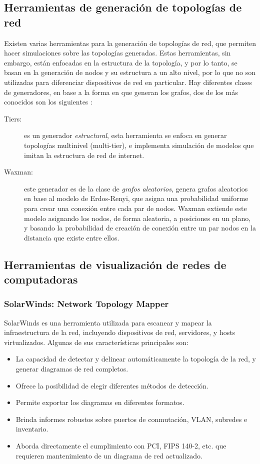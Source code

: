\subsection{Herramientas de generación de topologías de red}
Existen varias herramientas para la generación de topologías de red, que permiten hacer simulaciones sobre las topologías generadas. Estas herramientas, sin embargo, están enfocadas en la estructura de la topología, y por lo tanto, se basan en la generación de nodos y su estructura a un alto nivel, por lo que no son utilizadas para diferenciar dispositivos de red en particular.
Hay diferentes clases de generadores, en base a la forma en que generan los grafos, dos de los más conocidos son los siguientes \cite{tangmunarunkit2002network}:
\begin{description}
\item[Tiers:] es un generador \textit{estructural}, esta herramienta se enfoca en generar topologías multinivel (multi-tier), e implementa simulación de modelos que imitan la estructura de red de internet.

\item[Waxman:] este generador es de la clase de \textit{grafos aleatorios}, genera grafos aleatorios en base al modelo de Erdos-Renyi, que asigna una probabilidad uniforme para crear una conexión entre cada par de nodos. Waxman extiende este modelo asignando los nodos, de forma aleatoria, a posiciones en un plano, y basando la probabilidad de creación de conexión entre un par nodos en la distancia que existe entre ellos. 
\end{description}

\subsection{Herramientas de visualización de redes de computadoras} \label{Herramientas de visualización}
\subsubsection{SolarWinds: Network Topology Mapper \cite{solarwinds}} \label{SolarWinds Topology Mapper}
SolarWinds es una herramienta utilizada para escanear y mapear la infraestructura de la red, incluyendo dispositivos de red, servidores, y hosts virtualizados.
Algunas de sus características principales son:
\begin{itemize}
\item La capacidad de detectar y delinear automáticamente la topología de la red, y generar diagramas de red completos. 
\item Ofrece la posibilidad de elegir diferentes métodos de detección. \item Permite exportar los diagramas en diferentes formatos.
\item Brinda informes robustos sobre puertos de conmutación, VLAN, subredes e inventario.
\item Aborda directamente el cumplimiento con PCI, FIPS 140-2, etc. que requieren mantenimiento de un diagrama de red actualizado.
\end{itemize}

